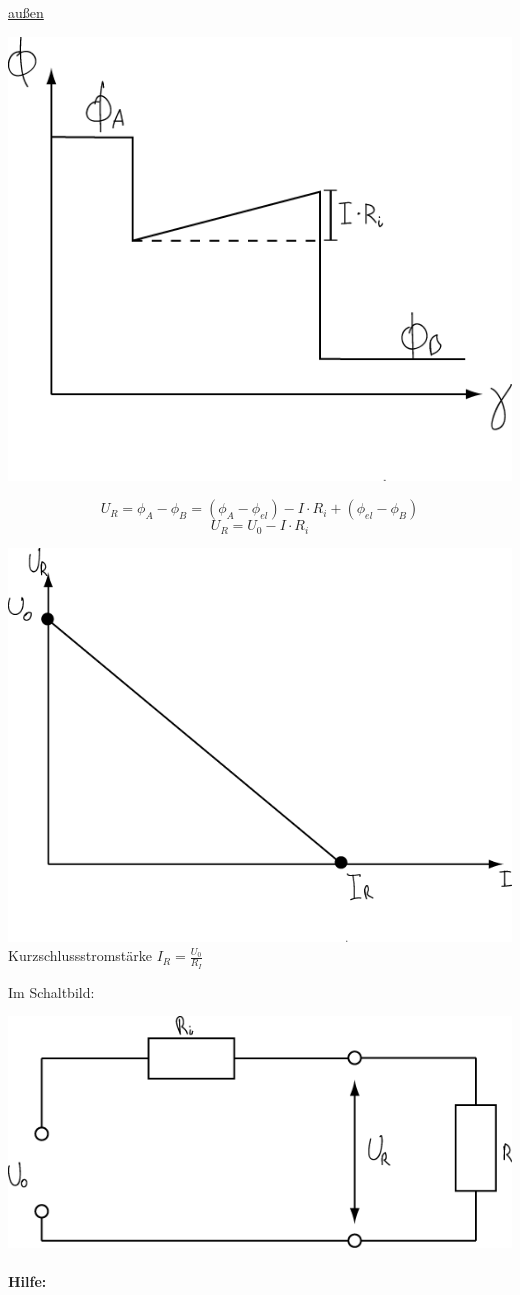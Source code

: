 \underline{außen}
\hypertarget{UR}{}
\begin{center}
	\includegraphics[width=0.5\linewidth]{skizzen/15/15_6/15_6B6}
\end{center}

$$ U_R = \phi_A-\phi_B = (\phi_A - \phi_{el}) - I \cdot R_i + (\phi_{el}-\phi_B) $$
$$ \boxed{U_R = U_0 - I \cdot R_i} $$

\begin{center}
	\includegraphics[width=0.5\linewidth]{skizzen/15/15_6/15_6B7}\\
	Kurzschlussstromstärke $ I_R = \frac{U_0}{R_I} $
\end{center}

Im Schaltbild:

\begin{center}
\includegraphics[width=0.6\linewidth]{skizzen/15/15_6/15_6B8}
\end{center}

\paragraph{Hilfe:}

